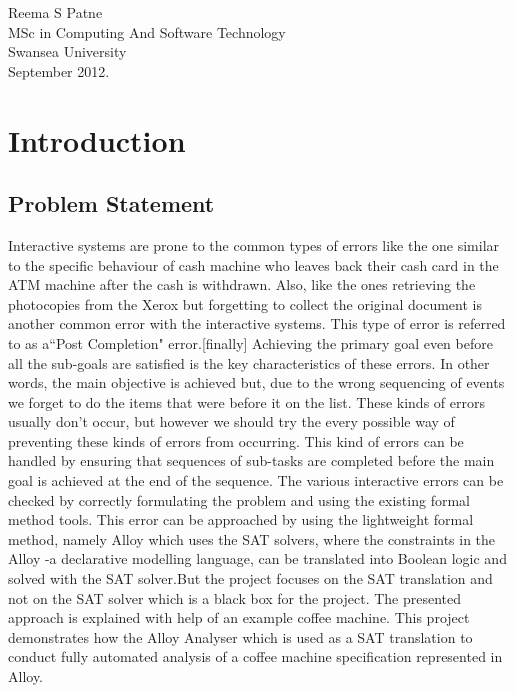\documentclass[a4paper,12pt]{extarticle}
\begin{document}
\begin{flushright}
Reema S Patne\\
MSc in Computing And Software Technology\\
Swansea University\\
September 2012.
\end{flushright}

\newpage
\tableofcontents
\maketitle
\newpage
\section{Introduction}
\label{Intro}
\subsection{Problem Statement}
\label{prob stat}
Interactive systems are prone to the common types of errors like the one similar to the specific behaviour of cash machine who leaves back their cash card in the ATM machine after the cash is withdrawn. Also, like the ones retrieving the photocopies from the Xerox but forgetting to collect the original document is another common error with the interactive systems. This type of error is referred to as a``Post Completion" error.[finally] Achieving the primary goal even before all the sub-goals are satisfied is the key characteristics of these errors. In other words, the main objective is achieved but, due to the wrong sequencing of events we forget to do the items that were before it on the list. These kinds of errors usually don't occur, but however we should try the every possible way of preventing these kinds of errors from occurring. This kind of errors can be handled by ensuring that sequences of sub-tasks are completed before the main goal is achieved at the end of the sequence. The various interactive errors can be checked by correctly formulating the problem and using the existing formal method tools. This error can be approached by using the lightweight formal method, namely Alloy which uses the SAT solvers, where the constraints in the Alloy -a declarative modelling language, can be translated into Boolean logic and solved with the SAT solver.But the project focuses on the SAT translation and not on the  SAT solver which is a black box for the project. The presented approach is explained with help of an example coffee machine. This project demonstrates how the Alloy Analyser which is used as a SAT translation to conduct fully automated analysis of a coffee machine specification represented in Alloy. \\
\end{document}
